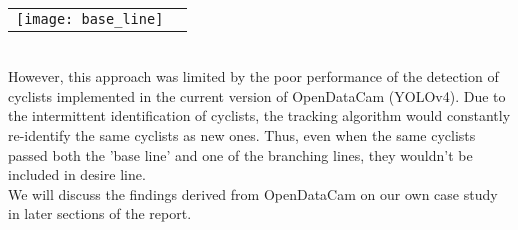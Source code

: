 \ \\
\raggedbottom
\noindent
\begin{tabular}{@{}cc}
\texttt{[image: base\_line]} 
\end{tabular}
\ \\

However, this approach was limited by the poor performance of the detection of cyclists implemented in the current 
version of OpenDataCam (YOLOv4). Due to the intermittent identification of cyclists, the tracking algorithm would constantly 
re-identify the same cyclists as new ones. Thus, even when the same cyclists passed both the 'base line' and one of the 
branching lines, they wouldn't be included in desire line.
\ \\

We will discuss the findings derived from OpenDataCam on our own case study in later sections of the report.